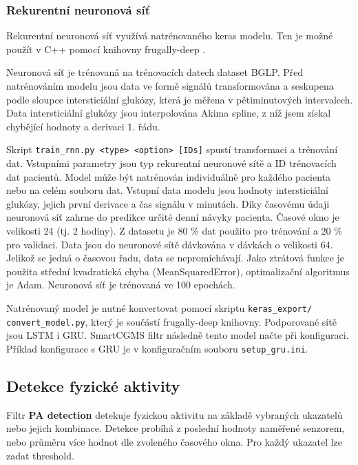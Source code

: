 \subsubsection{Rekurentní neuronová síť}

Rekurentní neuronová síť využívá natrénovaného keras modelu. Ten je možné použít v C++ pomocí knihovny frugally-deep \citep{cho.frugally}.

Neuronová síť je trénovaná na trénovacích datech dataset BGLP. Před natrénováním modelu jsou data ve formě signálů transformována a seskupena podle sloupce intersticiální glukózy, která je měřena v pětiminutových intervalech. Data intersticiální glukózy jsou interpolována Akima spline, z níž jsem získal chybějící hodnoty a derivaci 1. řádu.

Skript \texttt{train\_rnn.py <type> <option> [IDs]} spustí transformaci a trénování dat. Vstupními parametry jsou typ rekurentní neuronové sítě a ID trénovacích dat pacientů. Model může být natrénován individuálně pro každého pacienta nebo na celém souboru dat. Vstupní data modelu jsou hodnoty intersticiální glukózy, jejich první derivace a čas signálu v minutách. Díky časovému údaji neuronová síť zahrne do predikce určité denní návyky pacienta. Časové okno je velikosti 24 (tj. 2 hodiny). Z datasetu je 80 \% dat použito pro trénování a 20 \% pro validaci. Data jsou do neuronové sítě dávkována v dávkách o velikosti 64. Jelikož se jedná o časovou řadu, data se nepromíchávají. Jako ztrátová funkce je použita střední kvadratická chyba (MeanSquaredError), optimalizační algoritmus je Adam. Neuronová síť je trénovaná ve 100 epochách. 

Natrénovaný model je nutné konvertovat pomocí skriptu \texttt{keras\_export/ convert\_model.py}, který je součástí frugally-deep knihovny. Podporované sítě jsou LSTM i GRU. SmartCGMS filtr následně tento model načte při konfiguraci. Příklad konfigurace s GRU je v konfiguračním souboru \texttt{setup\_gru.ini}.



\subsection{Detekce fyzické aktivity}

Filtr \textbf{PA detection} detekuje fyzickou aktivitu na základě vybraných ukazatelů nebo jejich kombinace. Detekce probíhá z poslední hodnoty naměřené senzorem, nebo průměru více hodnot dle zvoleného časového okna. Pro každý ukazatel lze zadat threshold.

